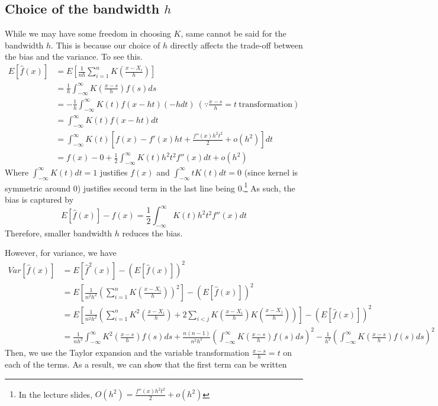 \documentclass[12pt]{article}
\theoremstyle{definition}
\theoremstyle{property}
\theoremstyle{assumption}
\theoremstyle{example}
\theoremstyle{comment}
\begin{document}
\subsection{Choice of the bandwidth $h$}
While we may have some freedom in choosing $K$, same cannot be said for the bandwidth $h$. This is because our choice of $h$ directly affects the trade-off between the bias and the variance. To see this.
\footnotesize{\begin{align*}
E[\hat{f}(x)]&=E\left[\frac{1}{nh}\sum_{i=1}^n K\left(\frac{x-X_i}{h}\right)\right]\\
&=\frac{1}{h}\int_{-\infty}^\infty K\left(\frac{x-s}{h}\right)f(s)ds\\
&=-\frac{1}{h}\int_{-\infty}^\infty K(t)f(x-ht)(-hdt) \ (\because \frac{x-s}{h}=t \ \text{transformation})\\
&=\int_{-\infty}^\infty K(t)f(x-ht)dt\\
&=\int_{-\infty}^\infty K(t)\left[f(x)-f'(x)ht + \frac{f''(x)h^2t^2}{2}+o(h^2)\right]dt\\
&=f(x)-0+\frac{1}{2}\int_{-\infty}^\infty K(t)h^2t^2f''(x)dt + o(h^2)
\end{align*}}\normalsize
Where $\int_{-\infty}^\infty K(t)dt=1$ justifies $f(x)$ and $\int_{-\infty}^\infty tK(t)dt=0$ (since kernel is symmetric around 0) justifies second term in the last line being 0.\footnote{In the lecture slides, $O(h^2)=\frac{f''(x)h^2t^2}{2}+o(h^2)$} As such, the bias is captured by 
\[
E[\hat{f}(x)]-f(x)=\frac{1}{2}\int_{-\infty}^\infty K(t)h^2t^2f''(x)dt
\]
Therefore, smaller bandwidth $h$ reduces the bias.\par
 However, for variance, we have
 \footnotesize{\begin{align*}
Var[\hat{f}(x)]&=E[\hat{f}^2(x)]-(E[\hat{f}(x)])^2\\ 
&=E\left[\frac{1}{n^2h^2}\left(\sum_{i=1}^nK\left(\frac{x-X_i}{h}\right)\right)^2\right]-(E[\hat{f}(x)])^2\\
&=E\left[\frac{1}{n^2h^2}\left(\sum_{i=1}^nK^2\left(\frac{x-X_i}{h}\right)+2\sum_{i<j} K\left(\frac{x-X_i}{h}\right)K\left(\frac{x-X_j}{h}\right)\right)\right]-(E[\hat{f}(x)])^2\\
&=\frac{1}{nh^2}\int_{-\infty}^\infty K^2\left(\frac{x-s}{h}\right)f(s)ds+\frac{n(n-1)}{n^2h^2}\left(\int_{-\infty}^\infty K\left(\frac{x-s}{h}\right)f(s)ds\right)^2-\frac{1}{h^2}\left(\int_{-\infty}^\infty K\left(\frac{x-s}{h}\right)f(s)ds\right)^2
 \end{align*}}\normalsize
 Then, we use the Taylor expansion and the variable transformation $\frac{x-s}{h}=t$ on each of the terms. As a result, we can show that the first term can be written
\end{document}
